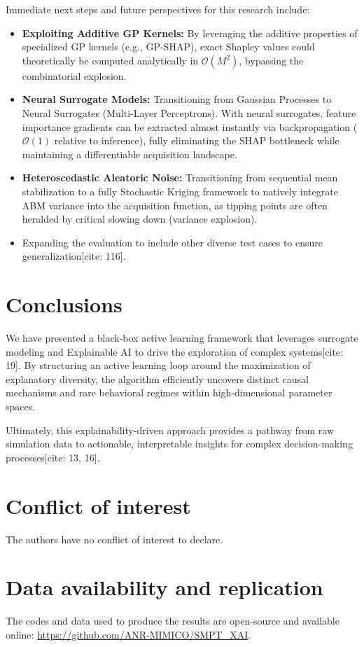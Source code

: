 \documentclass[sn-mathphys]{sn-jnl}
\theoremstyle{thmstyleone}%
\theoremstyle{thmstyletwo}%
\theoremstyle{thmstylethree}%
\begin{document}
Immediate next steps and future perspectives for this research include:
\begin{itemize}
    \item \textbf{Exploiting Additive GP Kernels:} By leveraging the additive properties of specialized GP kernels (e.g., GP-SHAP), exact Shapley values could theoretically be computed analytically in $\mathcal{O}(M^2)$, bypassing the combinatorial explosion.
    \item \textbf{Neural Surrogate Models:} Transitioning from Gaussian Processes to Neural Surrogates (Multi-Layer Perceptrons). With neural surrogates, feature importance gradients can be extracted almost instantly via backpropagation ($\mathcal{O}(1)$ relative to inference), fully eliminating the SHAP bottleneck while maintaining a differentiable acquisition landscape.
    \item \textbf{Heteroscedastic Aleatoric Noise:} Transitioning from sequential mean stabilization to a fully Stochastic Kriging framework to natively integrate ABM variance into the acquisition function, as tipping points are often heralded by critical slowing down (variance explosion).
    \item Expanding the evaluation to include other diverse test cases to ensure generalization[cite: 116].
\end{itemize}

\section{Conclusions}
We have presented a black-box active learning framework that leverages surrogate modeling and Explainable AI to drive the exploration of complex systems[cite: 19]. By structuring an active learning loop around the maximization of explanatory diversity, the algorithm efficiently uncovers distinct causal mechanisms and rare behavioral regimes within high-dimensional parameter spaces.

Ultimately, this explainability-driven approach provides a pathway from raw simulation data to actionable, interpretable insights for complex decision-making processes[cite: 13, 16].

\section*{Conflict of interest}
The authors have no conflict of interest to declare.

\section*{Data availability and replication}
The codes and data used to produce the results are open-source and available online: {\url{https://github.com/ANR-MIMICO/SMPT_XAI}}.
\end{document}
